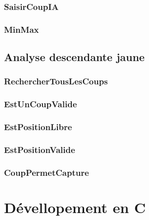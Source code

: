     \subsubsection{SaisirCoupIA}
      
    \subsubsection{MinMax}
      


  \subsection{Analyse descendante jaune}
    \subsubsection{RechercherTousLesCoups}
      
    \subsubsection{EstUnCoupValide}
      
    \subsubsection{EstPositionLibre}
      
    \subsubsection{EstPositionValide}
      
    \subsubsection{CoupPermetCapture}
      

  \newpage
  \section{Dévellopement en C}
    
    
  \newpage
  

